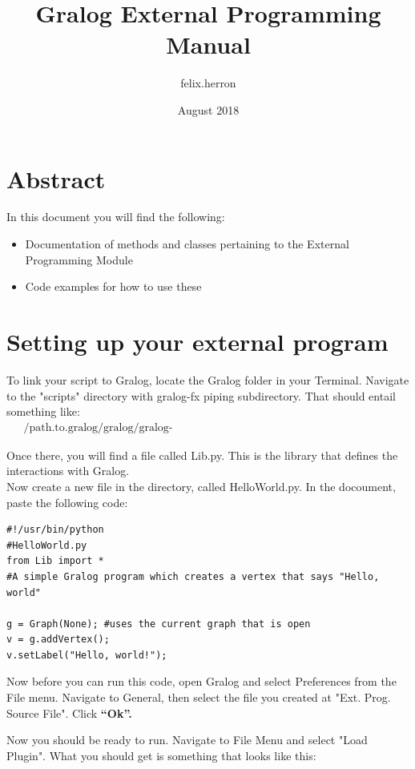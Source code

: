 \documentclass{article}
\title{Gralog External Programming Manual}
\author{felix.herron }
\date{August 2018}
\begin{document}
\maketitle

\section{Abstract}
In this document you will find the following:

\begin{itemize}
    \item Documentation of methods and classes pertaining to the External Programming Module
    \item Code examples for how to use these
\end{itemize}

\section{Setting up your external program}
To link your script to Gralog, locate the Gralog folder in your Terminal. Navigate to the "scripts" directory with gralog-fx piping subdirectory. That should entail something like:
\begin{align*}
&\text{~/path.to.gralog/gralog/gralog-fx/src/main/java/gralog/gralogfx/piping/scripts}
\end{align*}

Once there, you will find a file called Lib.py. This is the library that defines the interactions with Gralog.\\

Now create a new file in the directory, called HelloWorld.py. In the docoument, paste the following code: 

\begin{lstlisting}
#!/usr/bin/python
#HelloWorld.py
from Lib import *
#A simple Gralog program which creates a vertex that says "Hello, world"

g = Graph(None); #uses the current graph that is open
v = g.addVertex();
v.setLabel("Hello, world!");
\end{lstlisting}

Now before you can run this code, open Gralog and select Preferences from the File menu. Navigate to General, then select the file you created at "Ext. Prog. Source File". Click \textbf{``Ok''.}

Now you should be ready to run. Navigate to File Menu and select "Load Plugin". What you should get is something that looks like this: 
\end{document}
